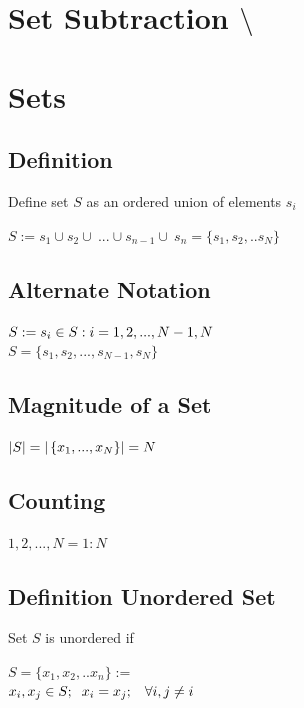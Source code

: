 \documentclass[11pt]{article}
\begin{document}
\section{Set Subtraction $\setminus$}


\section{Sets}




\subsection{Definition}
Define set $S$ as an ordered union of elements $s_i$

\begin{center}
$
S :=   s_1 \cup  s_2 \cup\ ... \cup s_{n-1} \cup\ s_n = \{s_1,s_2,..s_N\}
$
\end{center}
\subsection{Alternate Notation}
\begin{center}
$
S := s_i \in  S :  i=1,2,...,N-1,N \hspace{5mm}$
\\$
S = \{s_1,s_2,...,s_{N-1},s_N\}
$

\end{center}





\subsection{Magnitude of a Set}
\begin{center}
$
|S| = |\hspace{.5mm} \{x_1,...,x_N\}| = N
$
\end{center}




\subsection{Counting}
\begin{center}
$1,2,...,N = 1:N$
\end{center}



\subsection{Definition Unordered Set}
Set $S$ is unordered if
\begin{center}
$
S = \{x_1,x_2,..x_n\} :=
$
\\
$
x_i,x_j \in S; \hspace{2mm} x_i = x_j; \hspace{3mm}\forall i,j \neq i
$
\end{center}
\end{document}

